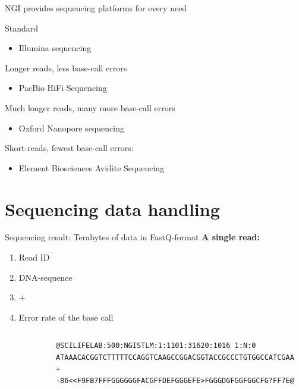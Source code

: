 \documentclass[10pt]{beamer}
\newcommand{\feature}[1]{{\color{scLime} \textbf{#1}}}
\begin{document}
\begin{frame}{NGI provides sequencing platforms for every need}
	\begin{exampleblock}{Standard}
		\begin{itemize}
			\item Illumina sequencing
		\end{itemize}
	\end{exampleblock}
	\begin{alertblock}{Longer reads, less base-call errors}
	\begin{itemize}
		\item PacBio HiFi Sequencing
	\end{itemize}
\end{alertblock}
	\begin{alertblock}{Much longer reads, many more base-call errors}
	\begin{itemize}
		\item Oxford Nanopore sequencing
	\end{itemize}
\end{alertblock}
	\begin{alertblock}{Short-reads, fewest base-call errors:}
		\begin{itemize}
			\item Element Biosciences Avidite Sequencing
		\end{itemize}
	\end{alertblock}
\end{frame}


\section{Sequencing data handling}


\begin{frame}[fragile]{Sequencing result: Terabytes of data in FastQ-format}
	\feature{A single read:}
	\begin{enumerate}
		\item Read ID
		\item DNA-sequence
		\item +
		\item Error rate of the base call
	\end{enumerate}
	\vspace{1em}
	\hrulefill
	\vspace{1em}
\begin{columns}[T]
	\column{\dimexpr\paperwidth-10pt}
		\begin{lstlisting}
			@SCILIFELAB:500:NGISTLM:1:1101:31620:1016 1:N:0
			ATAAACACGGTCTTTTTCCAGGTCAAGCCGGACGGTACCGCCCTGTGGCCATCGAA
			+
			-86<<F9FB7FFFGGGGGGFACGFFDEFGGGEFE>FGGGDGFGGFGGCFG?FF7E@
		\end{lstlisting}
\end{columns}
\end{frame}
\end{document}
